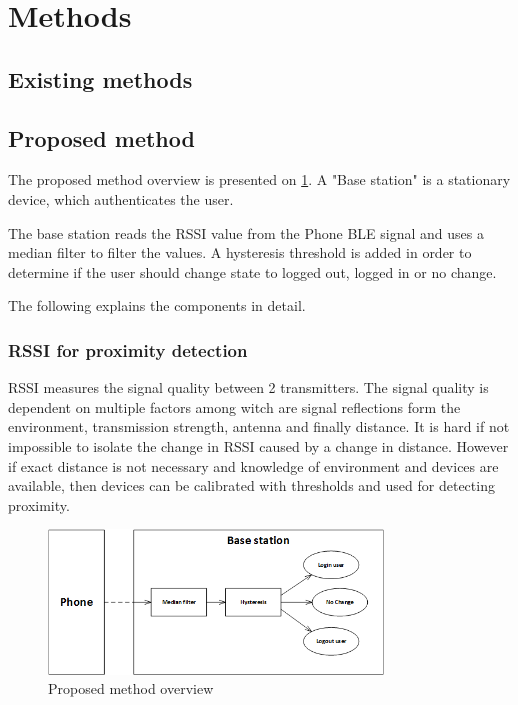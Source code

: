 \section{Methods}

\subsection{Existing methods}

\subsection{Proposed method}

The proposed method overview is presented on \cref{fig_solution_overview}. A "Base station" is a stationary device, which authenticates the user.

The base station reads the RSSI value from the Phone BLE signal and uses a median filter to filter the values. A hysteresis threshold is added in order to determine if the user should change state to logged out, logged in or no change.

The following explains the components in detail.

\subsubsection{RSSI for proximity detection}

RSSI measures the signal quality between 2 transmitters.
The signal quality is dependent on multiple factors among witch are signal reflections form the environment, transmission strength, antenna and finally distance. 
It is hard if not impossible to isolate the change in RSSI caused by a change in distance.
However if exact distance is not necessary and knowledge of environment and devices are available, then devices can be calibrated with thresholds and used for detecting proximity.


\begin{figure}[!t]
	\centering
	\includegraphics[width=3.5in]{img/SolutionOverview}
	\caption{ Proposed method overview }
	\label{fig_solution_overview}
\end{figure}

